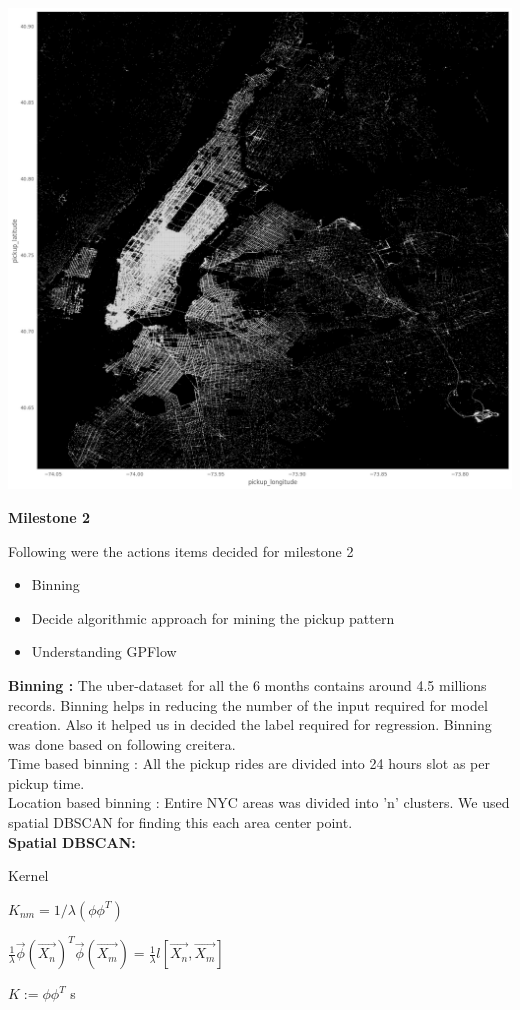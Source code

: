 \documentclass[12pt]{article}
\begin{document}
\includegraphics[width=\textwidth]{Complete.png}	

\break

\textbf{Milestone 2}

Following were the actions items decided for milestone 2
\begin{itemize}
	\item Binning
	\item Decide algorithmic approach for mining the pickup pattern
	\item Understanding GPFlow
\end{itemize}


\textbf{Binning  : }
The uber-dataset for all the 6 months contains around 4.5 millions records. Binning helps in reducing the number of the input required for model creation. Also it helped us in decided the label required for regression. 
Binning was done based on following creitera. \\
Time based binning : All the pickup rides are divided into 24 hours slot as per pickup time. \\
Location based binning : Entire NYC areas was divided into 'n' clusters. We used spatial DBSCAN for finding this each area center point.  \\

\textbf{Spatial DBSCAN:}


Kernel \\
\begin{center}
$K_{nm} = 1/\lambda \left ( \phi \phi ^{T} \right )$ \break

$\frac{1}{\lambda } \overrightarrow{\phi }\left ( \overrightarrow{X_{n}} \right )^{T}\overrightarrow{\phi }\left ( \overrightarrow{X_{m}} \right ) = \frac{1}{\lambda }l\left [ \overrightarrow{X_{n}},\overrightarrow{X_{m}} \right ]$ \break

$ K := \phi \phi ^{T}$ \break
s
\end{center}
\end{document}
